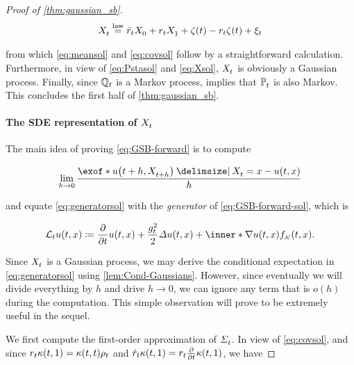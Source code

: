 \begin{proof}[Proof of \cref{thm:gaussian_sb}]
\begin{align}
\label{eq:Xsol}
\Xsol \eqlaw \ratioc \Xsol[0] + \ratio \Xsol[\horizon] + \tshift - \ratio \tshift + \xi_\ctime
\end{align}

from which \eqref{eq:meansol} and \eqref{eq:covsol} follow by a straightforward calculation. Furthermore, in view of \eqref{eq:Pstasol} and \eqref{eq:Xsol}, $X^{}_{ t }$ is obviously a Gaussian process. Finally, since $\mathbb{Q}_{ t }$ is a Markov process, \cite[Theorem 2.12]{leonard2013survey} implies that $\mathbb{P}^{}_{ t }$ is also Markov. This concludes the first half of \cref{thm:gaussian_sb}.


\paragraph{The SDE representation of $X^{}_{ t }$}
The main idea of proving \eqref{eq:GSB-forward} is to compute

\begin{equation}
\label{eq:generatorsol}
\lim_{ h\to 0}  \frac{  \exof*{ \testf[\ctime+h][\Xsol[\ctime+h]] \given \Xsol = x }  - \testf  }{h}
\end{equation}

and equate \eqref{eq:generatorsol} with the \emph{generator} of \eqref{eq:GSB-forward-sol}, which is \citep{protter2005stochastic}

\begin{equation}
\label{eq:gensde}
\generator \testf \defeq  \frac{\del}{\del \ctime} \testf +  \frac{\volatsq[\ctime]}{2} \Laplace \testf +  \inner*{  \nabla \testf }{ \GSBf }.
\end{equation}

Since $X^{}_{ t }$ is a Gaussian process, we may derive the conditional expectation in \eqref{eq:generatorsol} using \cref{lem:Cond-Gaussians}. However, since eventually we will divide everything by $h$ and drive $h\to 0$, we can ignore any term that is $o(h)$ during the computation. This simple observation will prove to be extremely useful in the sequel.


We first compute the first-order approximation of $\Sigma^{}_{ t }$. In view of \eqref{eq:covsol}, and since $\ratio \kernel[\ctime][\horizon] = \kernel[\ctime][\ctime]\efftr$ and $\dratio\kernel[\ctime][\horizon]=\ratio \frac{\del}{\del \ctime} \kernel[\ctime][\horizon]$, we have


\end{proof}
